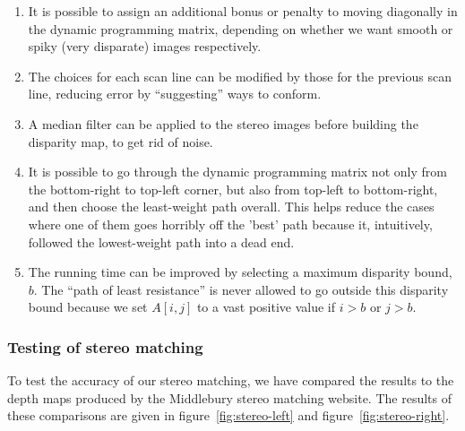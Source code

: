 \begin{enumerate}
\item It is possible to assign an additional bonus or penalty to moving
  diagonally in the dynamic programming matrix, depending on whether we want
  smooth or spiky (very disparate) images respectively.

\item The choices for each scan line can be modified by those for the previous
  scan line, reducing error by ``suggesting'' ways to conform.

\item A median filter can be applied to the stereo images before building the
  disparity map, to get rid of noise.

\item It is possible to go through the dynamic programming matrix not only from
  the bottom-right to top-left corner, but also from top-left to bottom-right,
  and then choose the least-weight path overall. This helps reduce the cases
  where one of them goes horribly off the 'best' path because it, intuitively,
  followed the lowest-weight path into a dead end.

\item The running time can be improved by selecting a maximum disparity bound,
  $b$. The ``path of least resistance'' is never allowed to go outside this
  disparity bound because we set $A[i,j]$ to a vast positive value if $i > b$ or
  $j > b$.
\end{enumerate}




\subsubsection{Testing of stereo matching}
To test the accuracy of our stereo matching, we have compared the results to the
depth maps produced by the Middlebury stereo matching website. The results of
these comparisons are given in figure~\ref{fig:stereo-left} and
figure~\ref{fig:stereo-right}.

